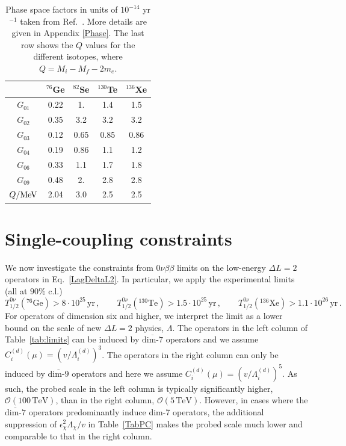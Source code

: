 \documentclass[letterpaper,11pt]{article}
\newcommand{\textoverline}[1]{$\overline{\mbox{#1}}$}
\begin{document}
\begin{table}
\center
\begin{tabular}{|c|cccc|}
\hline
\hline
\cite{Horoi:2017gmj}	    & $^{76}$Ge & $^{82}$Se & $^{130}$Te & $^{136}$Xe \\ 

\hline
$G_{01}$    & 0.22 & 1. & 1.4 & 1.5 \\
$G_{02}$    & 0.35 & 3.2 & 3.2 & 3.2 \\
$G_{03}$    & 0.12 & 0.65 & 0.85 & 0.86 \\
$G_{04}$    & 0.19 & 0.86 & 1.1 & 1.2 \\
$G_{06}$    & 0.33 & 1.1 & 1.7 & 1.8 \\
$G_{09}$    & 0.48 & 2. & 2.8 & 2.8 \\\hline
\hline
$Q/{\rm MeV} $ \cite{Stoica:2013lka} & 2.04& 3.0&2.5 & 2.5 \\
\hline\hline
\end{tabular}
\caption{Phase space factors in units of $10^{-14}$ yr$^{-1}$ taken from Ref.~\cite{Horoi:2017gmj}. More details are given in Appendix \ref{Phase}. The last row shows the $Q$ values for the different isotopes, where $Q = M_i - M_f -2m_e$.}
\label{Tab:phasespace}
\end{table}



\section{Single-coupling constraints }\label{single}
We now investigate the constraints from $0\nu\beta\beta$ limits on the low-energy $\Delta L=2$ operators in Eq.~\eqref{LagDeltaL2}.  
In particular, we apply the experimental limits \cite{Agostini:2018tnm,KamLAND-Zen:2016pfg,Alduino:2017ehq} (all at $90\%$ c.l.)
\begin{equation}
T^{0\nu}_{1/2}({}^{76}\mathrm{Ge}) > 8\cdot10^{25}\,\mathrm{yr}\,, \qquad T^{0\nu}_{1/2}({}^{130}\mathrm{Te}) > 1.5\cdot10^{25}\,\mathrm{yr}\,,\qquad T^{0\nu}_{1/2}({}^{136}\mathrm{Xe}) > 1.1\cdot10^{26}\,\mathrm{yr}\, .
\end{equation}
For operators of dimension six and higher, we interpret the limit as a lower bound on the scale of new $\Delta L=2$ physics, $\Lambda$. The operators in the left column of Table~\ref{tab:limits}  can be induced by \textoverline{dim-7} operators and we assume $C^{(d)}_i(\mu) =( v/\Lambda^{(d)}_i)^3$. The operators in the right column can only be induced by \textoverline{dim-9} operators and here we assume $C^{(d)}_i(\mu) = (v/\Lambda^{(d)}_i)^5$. As such, the probed scale in  the left column is typically significantly higher, $\mathcal O(100\,\mathrm{TeV})$,  than in the right column,  $\mathcal O(5\,\mathrm{TeV})$. However, in cases where the \textoverline{dim-7} operators predominantly induce dim-7 operators, the additional suppression of $\epsilon_\chi^2 \Lambda_\chi/v$ in Table~\ref{TabPC} makes the probed scale much lower and  comparable  to that in the right column.
\end{document}
